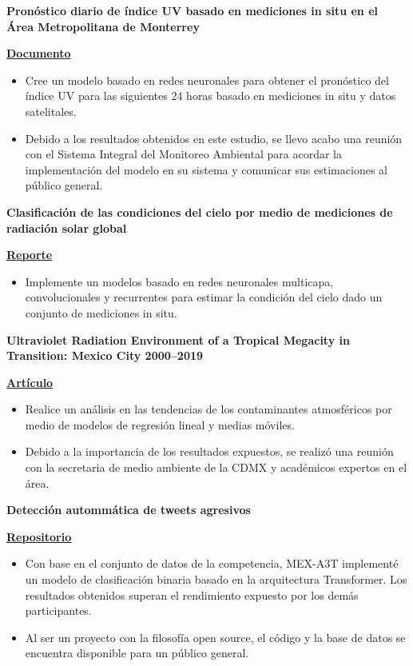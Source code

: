 \documentclass[a3paper]{adcv_color}
\newcommand{\proyect}[5]{\begin{minipage}{1\linewidth}
		\begin{minipage}{1\linewidth}
			\textbf{#1}
		\end{minipage}
	\end{minipage}
	\href{#4}{\textbf{#5}}
	\vspace{-1cm}\\
}
\begin{document}
\proyect{Pronóstico diario de índice UV basado en mediciones in situ en el Área Metropolitana de Monterrey}{Octubre 2023}{-0.8}{https://raw.githubusercontent.com/giovannilopez9808/Documents/master/Tesis/main.pdf}{Documento}
\begin{itemize}
	\setlength\itemsep{0em}
	\item Cree un modelo basado en redes neuronales para obtener el pronóstico del índice UV para las siguientes 24 horas basado en mediciones in situ y datos satelitales.
	\item Debido a los resultados obtenidos en este estudio, se llevo acabo una reunión con el Sistema Integral del Monitoreo Ambiental para acordar la implementación del modelo en su sistema y comunicar sus estimaciones al público general.
\end{itemize}
\proyect{Clasificación de las condiciones del cielo por medio de mediciones de radiación solar global}{Junio 2022}{-0.8}{https://github.com/giovannilopez9808/Cloud_classification/raw/main/Document/Main.pdf}{Reporte}
\begin{itemize}
	\setlength\itemsep{0em}
	\item Implemente un modelos basado en redes neuronales multicapa, convolucionales y recurrentes para estimar la condición del cielo dado un conjunto de mediciones in situ.
\end{itemize}
\proyect{Ultraviolet Radiation Environment of a Tropical Megacity in Transition: Mexico City 2000–2019}{Agosto 2021}{-0.6}{https://pubs.acs.org/doi/10.1021/acs.est.0c08515}{Artículo}
\begin{itemize}
	\setlength\itemsep{0em}
	\item Realice un análisis en las tendencias de los contaminantes atmosféricos por medio de modelos de regresión lineal y medias móviles.
	\item Debido a la importancia de los resultados expuestos, se realizó una reunión con la secretaria de medio ambiente de la CDMX y académicos expertos en el área.
\end{itemize}
\proyect{Detección autommática de tweets agresivos}{Agosto 2022}{-0.6}{https://github.com/giovannilopez9808/AgressiveDetectionMEXA3T}{Repositorio}
\begin{itemize}
	\setlength\itemsep{0em}
	\item Con base en el conjunto de datos de la competencia, MEX-A3T implementé un modelo de clasificación binaria basado en la arquitectura Transformer. Los resultados obtenidos superan el rendimiento expuesto por los demás participantes.
	\item  Al ser un proyecto con la filosofía open source, el código y la base de datos se encuentra disponible para un público general.
\end{itemize}
\end{document}
